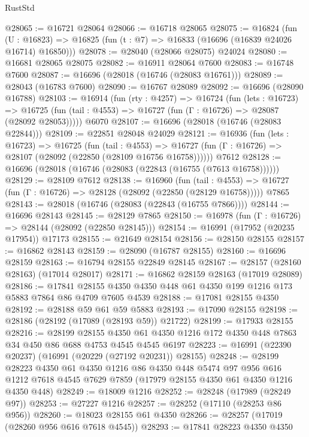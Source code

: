 \begin{lexlean}{RustStd}
\begin{coremodule}
@28065 := @16721 @28064
@28066 := @16718 @28065
@28075 := @16824
    (fun (U : @16823) => @16825 (fun (t : @7) => @16833 (@16696 (@16839 @24026 @16714) @16850)))
@28078 := @28040 (@28066 @28075) @24024
@28080 := @16681 @28065 @28075
@28082 := @16911 @28064 @7600
@28083 := @16748 @7600
@28087 := @16696 (@28018 (@16746 (@28083 @16761)))
@28089 := @28043 (@16783 @7600)
@28090 := @16767 @28089
@28092 := @16696 (@28090 @16788)
@28103 := @16914
    (fun (rty : @4257) =>
    @16724
      (fun (lets : @16723) =>
      @16725 (fun (tail : @4553) => @16727 (fun (Γ : @16726) => @28087 (@28092 @28053)))))
    @6070
@28107 := @16696 (@28018 (@16746 (@28083 @22844)))
@28109 := @22851 @28048 @24029
@28121 := @16936
    (fun (lets : @16723) =>
    @16725
      (fun (tail : @4553) =>
      @16727 (fun (Γ : @16726) => @28107 (@28092 (@22850 (@28109 @16756 @16758))))))
    @7612
@28128 := @16696 (@28018 (@16746 (@28083 (@22843 (@16755 (@7613 @16758))))))
@28129 := @28109 @7612
@28138 := @16960
    (fun (tail : @4553) => @16727 (fun (Γ : @16726) => @28128 (@28092 (@22850 (@28129 @16758)))))
    @7865
@28143 := @28018 (@16746 (@28083 (@22843 (@16755 @7866))))
@28144 := @16696 @28143
@28145 := @28129 @7865
@28150 := @16978 (fun (Γ : @16726) => @28144 (@28092 (@22850 @28145)))
@28154 := @16991 (@17952 (@20235 @17954)) @17173
@28155 := @21649 @28154
@28156 := @28150 @28155
@28157 := @16862 @28143
@28159 := @28090 (@16787 @28155)
@28160 := @16696 @28159
@28163 := @16794 @28155 @22849 @28145
@28167 := @28157 (@28160 @28163) (@17014 @28017)
@28171 := @16862 @28159 @28163 (@17019 @28089)
@28186 := @17841 @28155 @4350 @4350 @448 @61 @4350 @199 @1216 @173 @5883 @7864 @86 @4709 @7605 @4539
@28188 := @17081 @28155 @4350
@28192 := @28188 @59 @61 @59 @5883
@28193 := @17090 @28155
@28198 := @28186 (@28192 (@17089 (@28193 @59)) @21722)
@28199 := @17933 @28155
@28216 := @28199
    @28155
    @4350
    @61
    @4350
    @1216
    @172
    @4350
    @448
    @7863
    @34
    @450
    @86
    @688
    @4753
    @4545
    @4545
    @6197
@28223 := @16991 (@22390 @20237) (@16991 (@20229 (@27192 @20231)) @28155)
@28248 := @28199
    @28223
    @4350
    @61
    @4350
    @1216
    @86
    @4350
    @448
    @5474
    @97
    @956
    @616
    @1212
    @7618
    @4545
    @7629
    @7859
    (@17979 @28155 @4350 @61 @4350 @1216 @4350 @448)
@28249 := @18009 @1216
@28252 := @28248 (@17989 (@28249 @97))
@28253 := @27227 @1216
@28257 := @28252 (@17110 (@28253 @86 @956))
@28260 := @18023 @28155 @61 @4350
@28266 := @28257 (@17019 (@28260 @956 @616 @7618 @4545))
@28293 := @17841
    @28223
    @4350
    @4350

\end{coremodule}
\end{lexlean}

